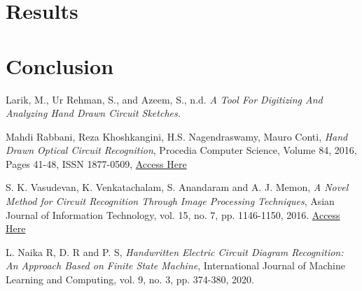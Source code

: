 \documentclass[conference]{IEEEtran}
\begin{document}


\section{\textbf{Results}}




\section{\textbf{Conclusion}}

\begin{thebibliography}{00}

Larik, M., Ur Rehman, S., and Azeem, S., n.d. \textit{A Tool For Digitizing And Analyzing Hand Drawn Circuit Sketches.}

Mahdi Rabbani, Reza Khoshkangini, H.S. Nagendraswamy, Mauro Conti,
\textit{Hand Drawn Optical Circuit Recognition}, Procedia Computer Science,
Volume 84,
2016,
Pages 41-48,
ISSN 1877-0509,
\href{https://www.sciencedirect.com/science/article/pii/S1877050916300783}{Access Here}

\bibitem{}
S. K. Vasudevan, K. Venkatachalam, S. Anandaram and A. J. Memon, \textit{A Novel Method for Circuit Recognition Through Image Processing Techniques}, Asian Journal of Information Technology, vol. 15, no. 7, pp. 1146-1150, 2016. \href{https://www.scopus.com/inward/record.uri?eid=2-s2.0-84975519853&partnerID=40&md5=079e85950109992c1991a272f31fc35b}{Access Here}

\bibitem{}
L. Naika R, D. R and P. S, \textit{Handwritten Electric Circuit Diagram Recognition: An Approach Based on Finite State Machine}, International Journal of Machine Learning and Computing, vol. 9, no. 3, pp. 374-380, 2020.

\end{thebibliography}
\end{document}

